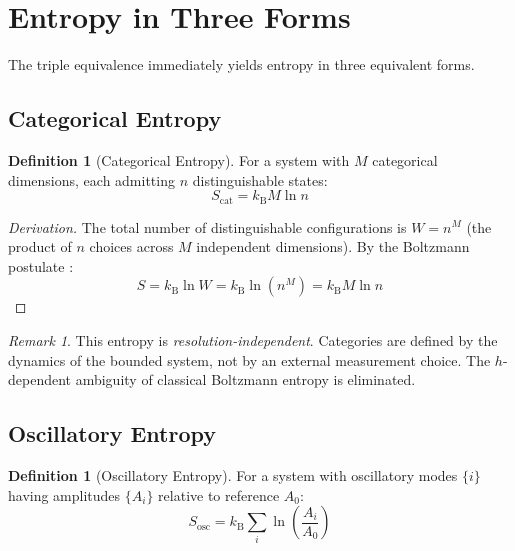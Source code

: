 \documentclass[twocolumn,10pt,a4paper]{article}
\theoremstyle{plain}
\theoremstyle{definition}
\newtheorem{definition}[theorem]{Definition}
\theoremstyle{remark}
\newtheorem{remark}[theorem]{Remark}
\newcommand{\kB}{k_{\mathrm{B}}}
\begin{document}
\section{Entropy in Three Forms}
\label{sec:entropy}

The triple equivalence immediately yields entropy in three equivalent forms.

\subsection{Categorical Entropy}

\begin{definition}[Categorical Entropy]
\label{def:cat_entropy}
For a system with $M$ categorical dimensions, each admitting $n$ distinguishable states:
\begin{equation}
    S_{\mathrm{cat}} = \kB M \ln n
\end{equation}
\end{definition}

\begin{proof}[Derivation]
The total number of distinguishable configurations is $W = n^M$ (the product of $n$ choices across $M$ independent dimensions). By the Boltzmann postulate \cite{boltzmann1877}:
\begin{equation}
    S = \kB \ln W = \kB \ln(n^M) = \kB M \ln n
\end{equation}
\end{proof}

\begin{remark}
This entropy is \emph{resolution-independent}. Categories are defined by the dynamics of the bounded system, not by an external measurement choice. The $h$-dependent ambiguity of classical Boltzmann entropy is eliminated.
\end{remark}

\subsection{Oscillatory Entropy}

\begin{definition}[Oscillatory Entropy]
For a system with oscillatory modes $\{i\}$ having amplitudes $\{A_i\}$ relative to reference $A_0$:
\begin{equation}
    S_{\mathrm{osc}} = \kB \sum_i \ln\!\left(\frac{A_i}{A_0}\right)
\end{equation}
\end{definition}
\end{document}
